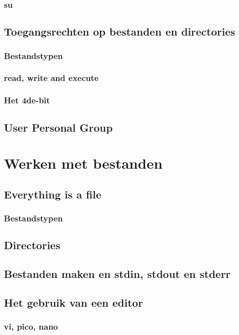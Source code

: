 \documentclass[a4paper,12pt,twoside,openright,titlepage]{book}
\begin{document}
\subsection{su}

\section{Toegangsrechten op bestanden en directories}
\subsection{Bestandstypen}
\subsection{read, write and execute}
\subsection{Het 4de-bit}
\section{User Personal Group}

\chapter{Werken met bestanden}
\section{Everything is a file}
\subsection{Bestandstypen}
\section{Directories}
\section{Bestanden maken en stdin, stdout en stderr}


\section{Het gebruik van een editor}

\subsection{vi, pico, nano}

\end{document}
